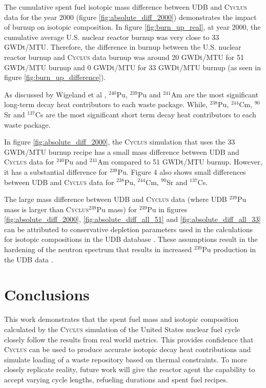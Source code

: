\documentclass{anstrans}
\newcommand{\Cyclus}{\textsc{Cyclus}\xspace}%
\begin{document}
The 
cumulative spent fuel isotopic mass difference between UDB and \Cyclus data for 
the year 2000 (figure \ref{fig:absolute_diff_2000}) demonstrates the impact of 
burnup on isotopic composition.  In figure 
\ref{fig:burn_up_real}, at year 2000, the cumulative average U.S. nuclear 
reactor burnup was very close to 33 GWDt/MTU. Therefore, the difference in 
burnup between the U.S. nuclear reactor burnup and \Cyclus data burnup was 
around 20 GWDt/MTU for 51 GWDt/MTU burnup and 0 GWDt/MTU for 33 GWDt/MTU burnup 
(as seen in figure \ref{fig:burn_up_difference}). 

As discussed by Wigeland et al \cite{wigeland_separations_2006}, $^{240}$Pu, 
$^{239}$Pu and $^{241}$Am are the most significant long-term decay heat 
contributors to each waste package. While, $^{238}$Pu, $^{244}$Cm, $^{90}$Sr 
and $^{137}$Cs are the most significant short term decay heat contributors 
\cite{wigeland_separations_2006} to each waste package. 


In figure \ref{fig:absolute_diff_2000}, the \Cyclus simulation that uses the 33 
GWDt/MTU burnup recipe has a small mass difference between UDB and \Cyclus data 
for $^{240}$Pu and $^{241}$Am compared to 51 GWDt/MTU burnup. However, it has a 
substantial difference for $^{239}$Pu. Figure 4 also shows small differences 
between UDB and \Cyclus data for $^{238}$Pu, $^{244}$Cm, $^{90}$Sr and 
$^{137}$Cs. 

The large mass difference between UDB and \Cyclus data (where UDB $^{239}$Pu 
mass is larger than \Cyclus $^{239}$Pu mass) for $^{239}$Pu in figures 
\ref{fig:absolute_diff_2000}, \ref{fig:absolute_diff_all_51} and 
\ref{fig:absolute_diff_all_33} can be attributed to conservative depletion 
parameters used in the calculations for isotopic compositions in the UDB 
database \cite{peterson_additional_2017}. These assumptions result in the 
hardening of the neutron spectrum that results in increased $^{239}$Pu 
production in the UDB data \cite{peterson_additional_2017}. 

\section{Conclusions}
This work demonstrates that the spent fuel mass and isotopic composition 
calculated by the \Cyclus simulation of the United States nuclear fuel cycle 
closely follow the results from real world metrics. This provides confidence 
that \Cyclus can be used to produce accurate isotopic decay heat contributions and 
simulate loading of a waste repository based on thermal constraints. 
To more closely replicate reality, future work will give the reactor agent the 
capability to accept varying cycle lengths, refueling durations and spent fuel 
recipes.
\end{document}
